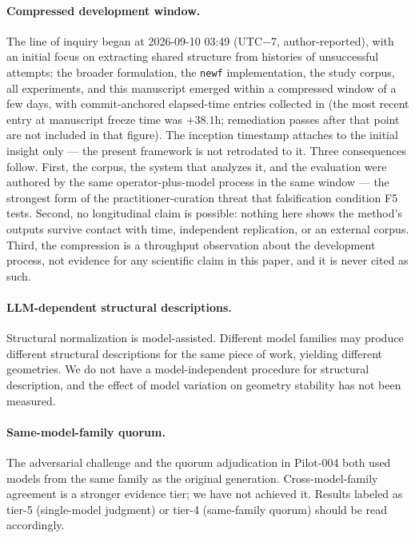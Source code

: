 \documentclass[11pt]{article}
\theoremstyle{gowthm}
\theoremstyle{gowplain}
\begin{document}
\paragraph{Compressed development window.}
The line of inquiry began at 2026-09-10 03:49 (UTC$-$7, author-reported),
with an initial focus on extracting shared structure from histories of
unsuccessful attempts; the broader formulation, the \texttt{newf}
implementation, the study corpus, all experiments, and this manuscript
emerged within a compressed window of a few days, with commit-anchored
elapsed-time entries collected in  (the most recent
entry at manuscript freeze time was $+38.1$h; remediation passes after that
point are not included in that figure). The inception
timestamp attaches to the initial insight only --- the present framework is
not retrodated to it. Three consequences follow. First, the corpus, the
system that analyzes it, and the evaluation were authored by the same
operator-plus-model process in the same window --- the strongest form of the
practitioner-curation threat that falsification condition F5 tests. Second,
no longitudinal claim is possible: nothing here shows the method's outputs
survive contact with time, independent replication, or an external corpus.
Third, the compression is a throughput observation about the development
process, not evidence for any scientific claim in this paper, and it is
never cited as such.

\paragraph{LLM-dependent structural descriptions.}
Structural normalization is model-assisted. Different model families may produce
different structural descriptions for the same piece of work, yielding different
geometries. We do not have a model-independent procedure for structural
description, and the effect of model variation on geometry stability has not
been measured.

\paragraph{Same-model-family quorum.}
The adversarial challenge and the quorum adjudication in Pilot-004 both used
models from the same family as the original generation. Cross-model-family
agreement is a stronger evidence tier; we have not achieved it. Results labeled
as tier-5 (single-model judgment) or tier-4 (same-family quorum) should be
read accordingly.
\end{document}
